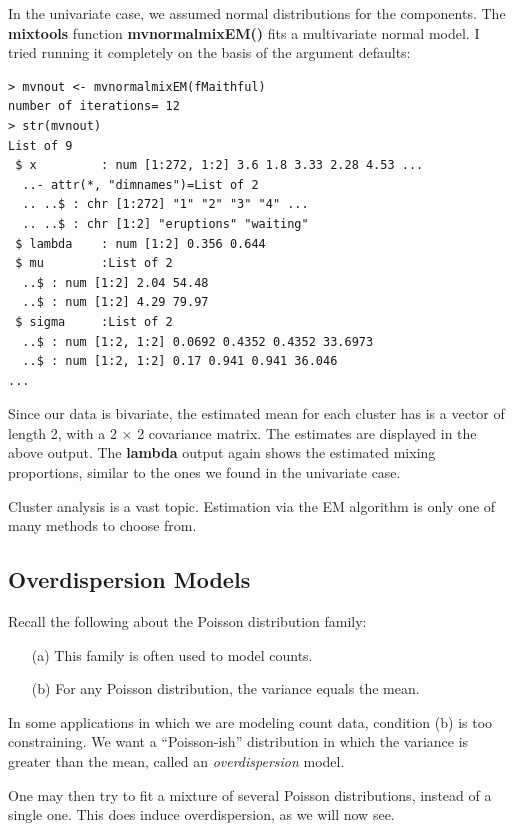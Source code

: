 \documentclass[11pt]{article}
\begin{document}
In the univariate case, we assumed normal distributions for the
components.  The \textbf{mixtools} function \textbf{mvnormalmixEM()} 
fits a multivariate normal model.  I tried running it completely on the
basis of the argument defaults:

\begin{lstlisting}
> mvnout <- mvnormalmixEM(fMaithful)
number of iterations= 12 
> str(mvnout)
List of 9
 $ x         : num [1:272, 1:2] 3.6 1.8 3.33 2.28 4.53 ...
  ..- attr(*, "dimnames")=List of 2
  .. ..$ : chr [1:272] "1" "2" "3" "4" ...
  .. ..$ : chr [1:2] "eruptions" "waiting"
 $ lambda    : num [1:2] 0.356 0.644
 $ mu        :List of 2
  ..$ : num [1:2] 2.04 54.48
  ..$ : num [1:2] 4.29 79.97
 $ sigma     :List of 2
  ..$ : num [1:2, 1:2] 0.0692 0.4352 0.4352 33.6973
  ..$ : num [1:2, 1:2] 0.17 0.941 0.941 36.046
...
\end{lstlisting}

Since our data is bivariate, the estimated mean for each cluster has
is a vector of length 2, with a 2 $\times$ 2 covariance matrix.  The
estimates are displayed in the above output.  The \textbf{lambda} output
again shows the estimated mixing proportions, similar to the ones we
found in the univariate case.

Cluster analysis is a vast topic.  Estimation via the EM algorithm is
only one of many methods to choose from.

\subsection{Overdispersion Models}

Recall the following about the Poisson distribution family:

\begin{itemize}

\item [(a)] This family is often used to model counts.

\item [(b)] For any Poisson distribution, the variance equals the mean.

\end{itemize}

In some applications in which we are modeling count data, condition (b)
is too constraining.  We want a ``Poisson-ish'' distribution in which
the variance is greater than the mean, called an {\it overdispersion}
model.

One may then try to fit a mixture of several Poisson distributions,
instead of a single one.  This does induce overdispersion, as we will
now see.  
\end{document}
